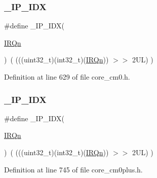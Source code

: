 \subsubsection{\texorpdfstring{\+\_\+\+I\+P\+\_\+\+I\+DX}{\_IP\_IDX}\hspace{0.1cm}{\footnotesize\ttfamily [1/3]}}
{\footnotesize\ttfamily \#define \+\_\+\+I\+P\+\_\+\+I\+DX(\begin{DoxyParamCaption}\item[{}]{\hyperlink{group___configuration__section__for___c_m_s_i_s_ga666eb0caeb12ec0e281415592ae89083}{I\+R\+Qn} }\end{DoxyParamCaption})~(   (((uint32\+\_\+t)(int32\+\_\+t)(\hyperlink{group___configuration__section__for___c_m_s_i_s_ga666eb0caeb12ec0e281415592ae89083}{I\+R\+Qn}))                $>$$>$    2\+U\+L)      )}



Definition at line 629 of file core\+\_\+cm0.\+h.

\mbox{\label{group___c_m_s_i_s___core___n_v_i_c_functions_ga370ec4b1751a6a889d849747df3763a9}} 
\subsubsection{\texorpdfstring{\+\_\+\+I\+P\+\_\+\+I\+DX}{\_IP\_IDX}\hspace{0.1cm}{\footnotesize\ttfamily [2/3]}}
{\footnotesize\ttfamily \#define \+\_\+\+I\+P\+\_\+\+I\+DX(\begin{DoxyParamCaption}\item[{}]{\hyperlink{group___configuration__section__for___c_m_s_i_s_ga666eb0caeb12ec0e281415592ae89083}{I\+R\+Qn} }\end{DoxyParamCaption})~(   (((uint32\+\_\+t)(int32\+\_\+t)(\hyperlink{group___configuration__section__for___c_m_s_i_s_ga666eb0caeb12ec0e281415592ae89083}{I\+R\+Qn}))                $>$$>$    2\+U\+L)      )}



Definition at line 745 of file core\+\_\+cm0plus.\+h.

\mbox{\label{group___c_m_s_i_s___core___n_v_i_c_functions_ga370ec4b1751a6a889d849747df3763a9}} 
